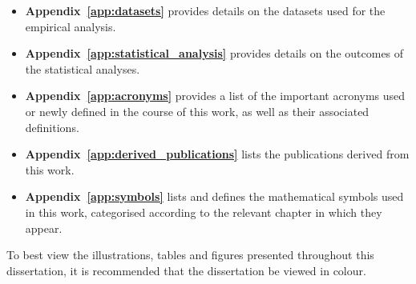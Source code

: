 \begin{itemize}
      \item
            \textbf{Appendix~\ref{app:datasets}} provides details on the datasets used
            for the empirical analysis.

      \item
            \textbf{Appendix~\ref{app:statistical_analysis}} provides details on the outcomes of the statistical analyses.

      \item
            \textbf{Appendix~\ref{app:acronyms}} provides a list of the important
            acronyms used or newly defined in the course of this work, as well as their
            associated definitions.

      \item
            \textbf{Appendix~\ref{app:derived_publications}} lists the publications
            derived from this work.

      \item
            \textbf{Appendix~\ref{app:symbols}} lists and defines the mathematical
            symbols used in this work, categorised according to the relevant chapter
            in which they appear.
\end{itemize}

To best view the illustrations, tables and figures presented throughout this
dissertation, it is recommended that the dissertation be viewed in colour.

